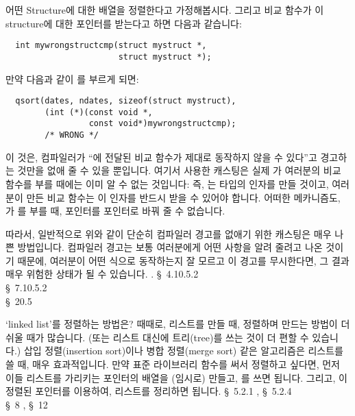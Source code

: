 \begin{faq}
        어떤 Structure에 대한 배열을 정렬한다고 가정해봅시다. 그리고 비교
        함수가 이 structure에 대한 포인터를 받는다고 하면 다음과 같습니다:
\begin{verbatim}
  int mywrongstructcmp(struct mystruct *, 
                       struct mystruct *);
\end{verbatim}
	\noindent 만약 다음과 같이 를 부르게 되면:
\begin{verbatim}
  qsort(dates, ndates, sizeof(struct mystruct),
        (int (*)(const void *,
                 const void*)mywrongstructcmp);
        /* WRONG */
\end{verbatim}
	이 것은, 컴파일러가 ``에 전달된 비교 함수가
        제대로 동작하지 않을 수 있다''고 경고하는 것만을 없애 줄 수 있을
        뿐입니다. 여기서 사용한 캐스팅은 실제 가 여러분의 비교 함수를
        부를 때에는 이미 알 수 없는 것입니다: 즉, 는 
         타입의 인자를 만들 것이고, 여러분이 만든 비교 함수는
        이 인자를 반드시 받을 수 있어야 합니다. 어떠한 메카니즘도,
        가 를 부를 때,  포인터를
         포인터로 바꿔 줄 수 없습니다.

        따라서, 일반적으로 위와 같이 단순히 컴파일러 경고를 없애기 위한
        캐스팅은 매우 나쁜 방법입니다. 컴파일러 경고는 보통 여러분에게
        어떤 사항을 알려 줄려고 나온 것이기 때문에, 여러분이 어떤 식으로
        동작하는지 잘 모르고 이 경고를 무시한다면, 그 결과 매우 위험한
        상태가 될 수 있습니다. .
\R
	\cite{ansi} \S\ 4.10.5.2 \\
	\cite{c89} \S\ 7.10.5.2 \\
	\cite{hs} \S\ 20.5 
\end{faq}

\begin{faq}
	`linked list'를 정렬하는 방법은?
\A
	때때로, 리스트를 만들 때, 정렬하며 만드는 방법이 더 쉬울 때가
	많습니다. (또는 리스트 대신에 트리(tree)를 쓰는 것이 더 편할 수
        있습니다.)  삽입 정렬(insertion sort)이나 
	병합 정렬(merge sort) 같은 알고리즘은 리스트를 쓸 때, 매우 효과적입니다.
	만약 표준 라이브러리 함수를 써서 정렬하고 싶다면, 먼저 이들
	리스트를 가리키는 포인터의 배열을 (임시로) 만들고, 를 쓰면
	됩니다.  그리고, 이 정렬된 포인터를 이용하여, 리스트를 정리하면
	됩니다.
\R
	\cite{knuth} \S\ 5.2.1 , \S\ 5.2.4  \\
	\cite{calgo} \S\ 8 , \S\ 12 
\end{faq}

